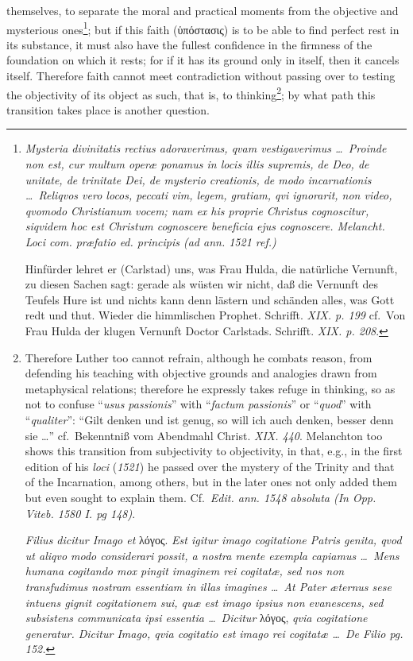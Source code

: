\documentclass[12pt]{book}
\newcommand{\opage}[1]{\marginnote{\footnotesize\textit{[#1]}}}
\begin{document}
themselves, to separate the moral and practical moments from the objective
and mysterious ones\footnote{\textit{Mysteria divinitatis rectius
adoraverimus, qvam vestigaverimus \ldots\ Proinde non est, cur multum operæ
ponamus in locis illis supremis, de Deo, de unitate, de trinitate Dei, de
mysterio creationis, de modo incarnationis \ldots\ Reliqvos vero locos,
peccati vim, legem, gratiam, qvi ignorarit, non video, qvomodo Christianum
vocem; nam ex his proprie Christus cognoscitur, siqvidem hoc est Christum
cognoscere beneficia ejus cognoscere. Melancht. Loci com. præfatio ed.
principis (ad ann. 1521 ref.)}

Hinfürder lehret er (Carlstad) uns, was Frau Hulda, die natürliche Vernunft,
zu diesen Sachen sagt: gerade als wüsten wir nicht, daß die Vernunft des
Teufels Hure ist und nichts kann denn lästern und schänden alles, was Gott
redt und thut. Wieder die himmlischen Prophet. Schrifft. \textit{XIX. p.
199} cf.\ Von Frau Hulda der klugen Vernunft Doctor Carlstads. Schrifft.
\textit{XIX. p. 208}.}; but if this faith (ὑπόστασις) is
\opage{74} \setcounter{footnote}{0}%
to be able to find perfect rest in its substance, it must also have the
fullest confidence in the firmness of the foundation on which it rests; for
if it has its ground only in itself, then it cancels itself. Therefore faith
cannot meet contradiction without passing over to testing the objectivity of
its object as such, that is, to thinking\footnote{Therefore Luther too cannot
refrain, although he combats reason, from defending his teaching with
objective grounds and analogies drawn from metaphysical relations; therefore
he expressly takes refuge in thinking, so as not to confuse
``\textit{usus passionis}'' with ``\textit{factum passionis}'' or
``\textit{quod}'' with ``\textit{qualiter}'': ``Gilt denken und ist genug, so
will ich auch denken, besser denn sie \ldots'' cf.\ Bekenntniß vom Abendmahl
Christ. \textit{XIX. 440}. Melanchton too shows this transition from
subjectivity to objectivity, in that, e.g., in the first edition of his
\textit{loci} (\textit{1521}) he passed over the mystery of the Trinity and
that of the Incarnation, among others, but in the later ones not only added
them but even sought to explain them. Cf.\ \textit{Edit. ann. 1548 absoluta
(In Opp. Viteb. 1580 I. pg 148)}.

\textit{Filius dicitur Imago et} λόγος. \textit{Est igitur imago cogitatione
Patris genita, qvod ut aliqvo modo considerari possit, a nostra mente exempla
capiamus \ldots\ Mens humana cogitando mox pingit imaginem rei cogitatæ, sed
nos non transfudimus nostram essentiam in illas imagines \ldots\ At Pater
æternus sese intuens gignit cogitationem sui, quæ est imago ipsius non
evanescens, sed subsistens communicata ipsi essentia \ldots\ Dicitur} λόγος,
\textit{qvia cogitatione generatur. Dicitur Imago, qvia cogitatio est imago
rei cogitatæ \ldots\ De Filio pg. 152.}}; by what path this transition takes
place is another question.
\end{document}
